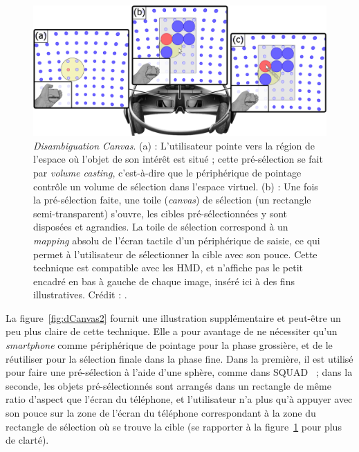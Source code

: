 	\begin{figure}[!htb]
		\centering
		\includegraphics[width=\textwidth]{figures/ch2/dCanvas}
		\caption[\emph{Disambiguation Canvas}]{\emph{Disambiguation Canvas}. (a) : L'utilisateur pointe vers la région de l'espace où l'objet de son intérêt est situé ; cette pré-sélection se fait par \emph{volume casting}, c'est-à-dire que le périphérique de pointage contrôle un volume de sélection dans l'espace virtuel. (b) : Une fois la pré-sélection faite, une \og toile \fg{} (\emph{canvas}) de sélection (un rectangle semi-transparent) s'ouvre, les cibles pré-sélectionnées y sont disposées et agrandies. La toile de sélection correspond à un \emph{mapping} absolu de l'écran tactile d'un périphérique de saisie, ce qui permet à l'utilisateur de sélectionner la cible avec son pouce. Cette technique est compatible avec les HMD, et n'affiche pas le petit encadré en bas à gauche de chaque image, inséré ici à des fins illustratives. Crédit : \cite{debarba2013disambiguation}.}
		\label{fig:dCanvas}
	\end{figure}
	
	La figure~\ref{fig:dCanvas2} fournit une illustration supplémentaire et peut-être un peu plus claire de cette technique. Elle a pour avantage de ne nécessiter qu'un \emph{smartphone} comme périphérique de pointage pour la phase grossière, et de le réutiliser pour la sélection finale dans la phase fine. Dans la première, il est utilisé pour faire une pré-sélection à l'aide d'une sphère, comme dans SQUAD~\cite{kopper2011rapid} ; dans la seconde, les objets pré-sélectionnés sont arrangés dans un rectangle de même ratio d'aspect que l'écran du téléphone, et l'utilisateur n'a plus qu'à appuyer avec son pouce sur la zone de l'écran du téléphone correspondant à la zone du rectangle de sélection où se trouve la cible (se rapporter à la figure~\ref{fig:dCanvas} pour plus de clarté).
	
